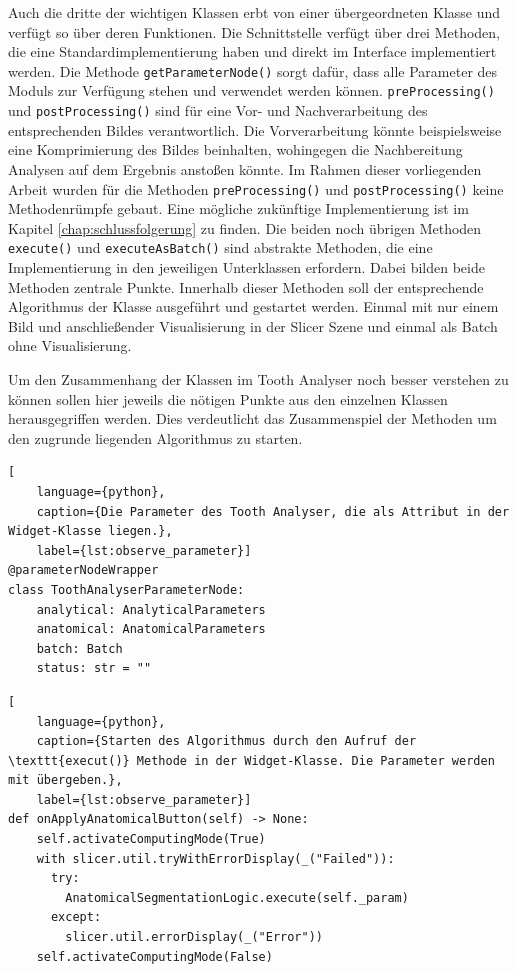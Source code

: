 Auch die dritte der wichtigen Klassen erbt von einer übergeordneten Klasse und verfügt
so über deren Funktionen. Die Schnittstelle verfügt über drei Methoden, die eine
Standardimplementierung haben und direkt im Interface implementiert werden. Die
Methode \texttt{getParameterNode()} sorgt dafür, dass alle Parameter des Moduls
zur Verfügung stehen und verwendet werden können. \texttt{preProcessing()} und
\texttt{postProcessing()} sind für eine Vor- und Nachverarbeitung des
entsprechenden Bildes verantwortlich. Die Vorverarbeitung könnte beispielsweise eine
Komprimierung des Bildes beinhalten, wohingegen die Nachbereitung Analysen auf
dem Ergebnis anstoßen könnte. Im Rahmen dieser vorliegenden Arbeit wurden für die
Methoden \texttt{preProcessing()} und \texttt{postProcessing()} keine Methodenrümpfe
gebaut. Eine mögliche zukünftige Implementierung ist im Kapitel
\ref{chap:schlussfolgerung} zu finden. Die beiden noch übrigen Methoden \texttt{execute()}
und \texttt{executeAsBatch()} sind abstrakte Methoden, die eine Implementierung
in den jeweiligen Unterklassen erfordern. Dabei bilden beide Methoden zentrale Punkte.
Innerhalb dieser Methoden soll der entsprechende Algorithmus der Klasse
ausgeführt und gestartet werden. Einmal mit nur einem Bild und anschließender Visualisierung
in der Slicer Szene und einmal als Batch ohne Visualisierung.

\pagebreak

Um den Zusammenhang der Klassen im Tooth Analyser noch besser verstehen zu
können sollen hier jeweils die nötigen Punkte aus den einzelnen Klassen
herausgegriffen werden. Dies verdeutlicht das Zusammenspiel der Methoden um den zugrunde
liegenden Algorithmus zu starten.

\begin{lstlisting}[
    language={python},
    caption={Die Parameter des Tooth Analyser, die als Attribut in der Widget-Klasse liegen.},
    label={lst:observe_parameter}]
@parameterNodeWrapper
class ToothAnalyserParameterNode:
    analytical: AnalyticalParameters
    anatomical: AnatomicalParameters
    batch: Batch
    status: str = ""
\end{lstlisting}

\begin{lstlisting}[
    language={python},
    caption={Starten des Algorithmus durch den Aufruf der \texttt{execut()} Methode in der Widget-Klasse. Die Parameter werden mit übergeben.},
    label={lst:observe_parameter}]
def onApplyAnatomicalButton(self) -> None:
    self.activateComputingMode(True)
    with slicer.util.tryWithErrorDisplay(_("Failed")):
	  try:
	    AnatomicalSegmentationLogic.execute(self._param)
	  except:
	    slicer.util.errorDisplay(_("Error"))
    self.activateComputingMode(False)
\end{lstlisting}


